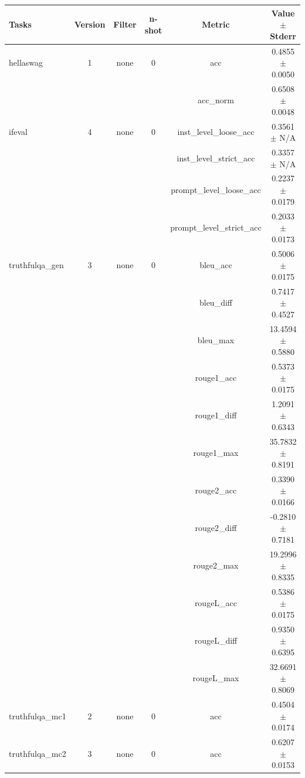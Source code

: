 \documentclass{ifacconf}
\begin{document}
\begin{strip}
\begin{minipage}{\textwidth}
			\begin{table}[H]
				\centering
				\begin{tabular}{|l|c|c|c|c|c|}
					\hline
					\textbf{Tasks} & \textbf{Version} & \textbf{Filter} & \textbf{n-shot} & \textbf{Metric} & \textbf{Value} $\pm$ \textbf{Stderr} \\ \hline
					hellaswag & 1 & none & 0 & acc & 0.4855 $\pm$ 0.0050 \\ \hline
					& & & & acc\_norm & 0.6508 $\pm$ 0.0048 \\ \hline
					ifeval & 4 & none & 0 & inst\_level\_loose\_acc & 0.3561 $\pm$ N/A \\ \hline
					& & & & inst\_level\_strict\_acc & 0.3357 $\pm$ N/A \\ \hline
					& & & & prompt\_level\_loose\_acc & 0.2237 $\pm$ 0.0179 \\ \hline
					& & & & prompt\_level\_strict\_acc & 0.2033 $\pm$ 0.0173 \\ \hline
					truthfulqa\_gen & 3 & none & 0 & bleu\_acc & 0.5006 $\pm$ 0.0175 \\ \hline
					& & & & bleu\_diff & 0.7417 $\pm$ 0.4527 \\ \hline
					& & & & bleu\_max & 13.4594 $\pm$ 0.5880 \\ \hline
					& & & & rouge1\_acc & 0.5373 $\pm$ 0.0175 \\ \hline
					& & & & rouge1\_diff & 1.2091 $\pm$ 0.6343 \\ \hline
					& & & & rouge1\_max & 35.7832 $\pm$ 0.8191 \\ \hline
					& & & & rouge2\_acc & 0.3390 $\pm$ 0.0166 \\ \hline
					& & & & rouge2\_diff & -0.2810 $\pm$ 0.7181 \\ \hline
					& & & & rouge2\_max & 19.2996 $\pm$ 0.8335 \\ \hline
					& & & & rougeL\_acc & 0.5386 $\pm$ 0.0175 \\ \hline
					& & & & rougeL\_diff & 0.9350 $\pm$ 0.6395 \\ \hline
					& & & & rougeL\_max & 32.6691 $\pm$ 0.8069 \\ \hline
					truthfulqa\_mc1 & 2 & none & 0 & acc & 0.4504 $\pm$ 0.0174 \\ \hline
					truthfulqa\_mc2 & 3 & none & 0 & acc & 0.6207 $\pm$ 0.0153 \\ \hline
				\end{tabular}
				\label{tab:gemma2_q5km}
			\end{table}
		\end{minipage}
	\end{strip}
	\vfill
	\clearpage
	\pagebreak
	
\end{document}

